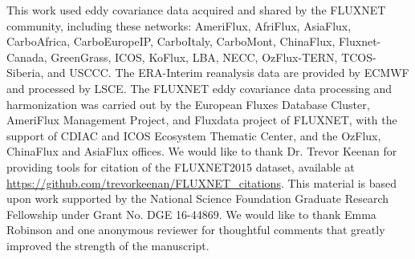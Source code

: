 \documentclass[draft]{agujournal2019}
\begin{document}
%
%
%
%
%
%
%
%


\acknowledgments This work used eddy covariance data acquired and
shared by the FLUXNET community, including these networks: AmeriFlux,
AfriFlux, AsiaFlux, CarboAfrica, CarboEuropeIP, CarboItaly, CarboMont,
ChinaFlux, Fluxnet-Canada, GreenGrass, ICOS, KoFlux, LBA, NECC,
OzFlux-TERN, TCOS-Siberia, and USCCC. The ERA-Interim reanalysis data
are provided by ECMWF and processed by LSCE. The FLUXNET eddy
covariance data processing and harmonization was carried out by the
European Fluxes Database Cluster, AmeriFlux Management Project, and
Fluxdata project of FLUXNET, with the support of CDIAC and ICOS
Ecosystem Thematic Center, and the OzFlux, ChinaFlux and AsiaFlux
offices. We would like to thank Dr. Trevor Keenan for providing tools
for citation of the FLUXNET2015 dataset, available at
\url{https://github.com/trevorkeenan/FLUXNET_citations}. This material
is based upon work supported by the National Science Foundation
Graduate Research Fellowship under Grant No. DGE 16-44869. We would
like to thank Emma Robinson and one anonymous reviewer for thoughtful
comments that greatly improved the strength of the manuscript.



%
%




%
%
%
%
%
\end{document}
